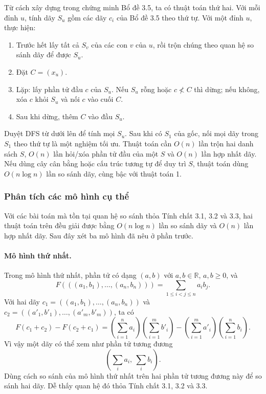 \documentclass[11pt]{article}
\begin{document}
Từ cách xây dựng trong chứng minh Bổ đề 3.5, ta có thuật toán thứ hai. Với mỗi
đỉnh $u$, tính dãy $S_u$ gồm các dãy $c_i$ của Bổ đề 3.5 theo thứ tự. Với một
đỉnh $u$, thực hiện:
\begin{enumerate}
  \item Trước hết lấy tất cả $S_v$ của các con $v$ của $u$, rồi trộn chúng theo
  quan hệ so sánh dãy để được $S_u$.
  \item Đặt $C=(x_u)$.
  \item Lặp: lấy phần tử đầu $c$ của $S_u$. Nếu $S_u$ rỗng hoặc $c\not< C$ thì
  dừng; nếu không, xóa $c$ khỏi $S_u$ và nối $c$ vào cuối $C$.
  \item Sau khi dừng, thêm $C$ vào đầu $S_u$.
\end{enumerate}

Duyệt DFS từ dưới lên để tính mọi $S_u$. Sau khi có $S_1$ của gốc, nối mọi dãy
trong $S_1$ theo thứ tự là một nghiệm tối ưu. Thuật toán cần $O(n)$ lần trộn hai
danh sách $S$, $O(n)$ lần hỏi/xóa phần tử đầu của một $S$ và $O(n)$ lần hợp
nhất dãy. Nếu dùng cây cân bằng hoặc cấu trúc tương tự để duy trì $S$, thuật
toán dùng $O(n\log n)$ lần so sánh dãy, cùng bậc với thuật toán 1.

\subsubsection{Phân tích các mô hình cụ thể}

Với các bài toán mà tồn tại quan hệ so sánh thỏa Tính chất 3.1, 3.2 và 3.3, hai
thuật toán trên đều giải được bằng $O(n\log n)$ lần so sánh dãy và $O(n)$ lần
hợp nhất dãy. Sau đây xét ba mô hình đã nêu ở phần trước.

\paragraph{Mô hình thứ nhất.}
Trong mô hình thứ nhất, phần tử có dạng $(a,b)$ với $a,b\in\mathbb R$,
$a,b\ge 0$, và
\[
  F(((a_1,b_1),\ldots,(a_n,b_n)))=\sum_{1\le i<j\le n}a_i b_j.
\]
Với hai dãy
$c_1=((a_1,b_1),\ldots,(a_n,b_n))$ và
$c_2=((a'_1,b'_1),\ldots,(a'_m,b'_m))$, ta có
\[
  F(c_1+c_2)-F(c_2+c_1)
  =
  \left(\sum_{i=1}^n a_i\right)\left(\sum_{i=1}^m b'_i\right)
  -
  \left(\sum_{i=1}^m a'_i\right)\left(\sum_{i=1}^n b_i\right).
\]
Vì vậy một dãy có thể xem như phần tử tương đương
\[
  \left(\sum_i a_i,\ \sum_i b_i\right).
\]
Dùng cách so sánh của mô hình thứ nhất trên hai phần tử tương đương này để so
sánh hai dãy. Dễ thấy quan hệ đó thỏa Tính chất 3.1, 3.2 và 3.3.
\end{document}
